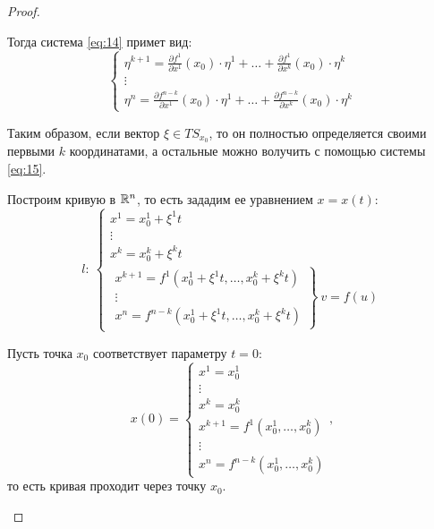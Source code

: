 \begin{proof}
\begin{enumerate}
              Тогда система \ref{eq:14} примет вид:
              \begin{equation}\label{eq:15}
                  \left\{\begin{array}{l}
                      \eta^{k+1} = \frac{\partial f^1}{\partial x^1}(x_0) \cdot \eta^1 + \ldots + \frac{\partial f^1}{\partial x^k}(x_0)\cdot \eta^k \\
                      \vdots                                                                                                                 \\
                      \eta^{n} = \frac{\partial f^{n-k}}{\partial x^1}(x_0) \cdot \eta^1 + \ldots + \frac{\partial f^{n-k}}{\partial x^k}(x_0)\cdot \eta^k
                  \end{array}\right.
              \end{equation}

              Таким образом, если вектор $\xi \in TS_{x_0}$, то он полностью определяется своими первыми $k$ координатами, а остальные можно волучить с помощью системы \ref{eq:15}.

              Построим кривую в $\mathbb{R}^n$, то есть зададим ее уравнением $x = x(t)$:
              \begin{equation}\label{eq:16}
                  l: \ \left\{\begin{array}{l}
                      x^1 = x_0^1 + \xi^1t  \\
                      \vdots                \\
                      x^k = x_0^k + \xi^k t \\
                      \left.\begin{array}{l}
                                x^{k+1} = f^1(x_0^1 + \xi^1 t, \ldots, x_0^k + \xi^k t) \\
                                \vdots                                                  \\
                                x^{n} = f^{n-k}(x_0^1 + \xi^1 t, \ldots, x_0^k + \xi^k t)
                            \end{array}\right\} \ v = f(u)
                  \end{array}\right.
              \end{equation}

              Пусть точка $x_0$ соответствует параметру $t = 0$:
              \[
                  x(0) = \left\{\begin{array}{l}
                      x^1 = x_0^1                       \\
                      \vdots                            \\
                      x^k = x_0^k                       \\
                      x^{k+1} = f^1(x_0^1,\ldots,x_0^k) \\
                      \vdots                            \\
                      x^n = f^{n-k}(x_0^1, \ldots, x_0^k)
                  \end{array}\right.,
              \]
              то есть кривая проходит через точку $x_0$.


\end{enumerate}
\end{proof}
